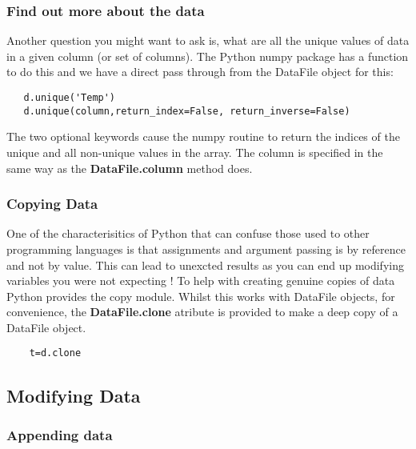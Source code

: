 \documentclass[a4paper,11pt]{scrartcl}
\begin{document}
\subsubsection{Find out more about the data}

Another question you might want to ask is, what are all the unique
values of data in a given column (or set of columns). The Python numpy
package has a function to do this and we have a direct pass through
from the DataFile object for this:

\begin{lstlisting}
   d.unique('Temp')
   d.unique(column,return_index=False, return_inverse=False)
\end{lstlisting}

The two optional keywords cause the numpy routine to return the
indices of the unique and all non-unique values in the array. The
column is specified in the same way as the \textbf{DataFile.column}
method does.

\subsubsection{Copying Data}

One of the characterisitics of Python that can confuse those used to other
programming languages is that assignments and argument passing is by reference
and not by value. This can lead to unexcted results as you can end up modifying variables you were not expecting ! To help with creating genuine copies of data Python provides the copy module. Whilst this works with DataFile objects, for convenience, the \textbf{DataFile.clone} atribute is provided to make a deep copy of a DataFile object.


\begin{lstlisting}
    t=d.clone
\end{lstlisting}


\subsection{Modifying Data}

\subsubsection{Appending data}
\end{document}
